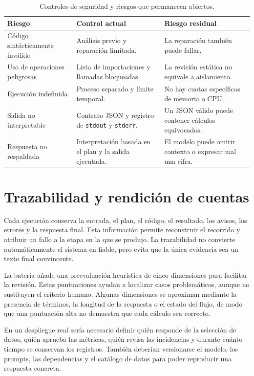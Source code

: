 \begin{table}[H]
\centering
\small
\begin{tabularx}{\textwidth}{L{0.27\textwidth}L{0.34\textwidth}Y}
\toprule
\textbf{Riesgo} & \textbf{Control actual} & \textbf{Riesgo residual} \\
\midrule
Código sintácticamente inválido & Análisis previo y reparación limitada. & La reparación también puede fallar. \\
Uso de operaciones peligrosas & Lista de importaciones y llamadas bloqueadas. & La revisión estática no equivale a aislamiento. \\
Ejecución indefinida & Proceso separado y límite temporal. & No hay cuotas específicas de memoria o CPU. \\
Salida no interpretable & Contrato JSON y registro de \texttt{stdout} y \texttt{stderr}. & Un JSON válido puede contener cálculos equivocados. \\
Respuesta no respaldada & Interpretación basada en el plan y la salida ejecutada. & El modelo puede omitir contexto o expresar mal una cifra. \\
\bottomrule
\end{tabularx}
\caption{Controles de seguridad y riesgos que permanecen abiertos.}
\label{tab:controles_riesgos_residuales}
\end{table}

\section{Trazabilidad y rendición de cuentas}

Cada ejecución conserva la entrada, el plan, el código, el resultado, los avisos, los errores y la respuesta final. Esta información permite reconstruir el recorrido y atribuir un fallo a la etapa en la que se produjo. La trazabilidad no convierte automáticamente el sistema en fiable, pero evita que la única evidencia sea un texto final convincente.

La batería añade una preevaluación heurística de cinco dimensiones para facilitar la revisión. Estas puntuaciones ayudan a localizar casos problemáticos, aunque no sustituyen el criterio humano. Algunas dimensiones se aproximan mediante la presencia de términos, la longitud de la respuesta o el estado del flujo, de modo que una puntuación alta no demuestra que cada cálculo sea correcto.

En un despliegue real sería necesario definir quién responde de la selección de datos, quién aprueba las métricas, quién revisa las incidencias y durante cuánto tiempo se conservan los registros. También deberían versionarse el modelo, los prompts, las dependencias y el catálogo de datos para poder reproducir una respuesta concreta.

